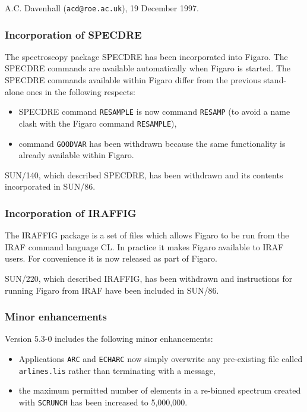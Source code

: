  A.C. Davenhall ({\tt acd@roe.ac.uk}), 19 December 1997.


\subsubsection{Incorporation of SPECDRE}

 The spectroscopy package SPECDRE has been incorporated into Figaro.  The
 SPECDRE commands are available automatically when Figaro is started.
 The SPECDRE commands available within Figaro differ from the previous
 stand-alone ones in the following respects:

\begin{itemize}

  \item SPECDRE command {\tt RESAMPLE} is now command {\tt RESAMP} (to
   avoid a name clash with the Figaro command {\tt RESAMPLE}),

  \item command {\tt GOODVAR} has been withdrawn because the same
   functionality is already available within Figaro.

\end{itemize}

 SUN/140, which described SPECDRE, has been withdrawn and its contents
 incorporated in SUN/86.

\subsubsection{Incorporation of IRAFFIG}

 The IRAFFIG package is a set of files which allows Figaro to be run
 from the IRAF command language CL.  In practice it makes Figaro
 available to IRAF users.  For convenience it is now released as part
 of Figaro.

 SUN/220, which described IRAFFIG, has been withdrawn and instructions for
 running Figaro from IRAF have been included in SUN/86.

\subsubsection{Minor enhancements}

 Version 5.3-0 includes the following minor enhancements:

\begin{itemize}

 \item Applications {\tt ARC} and {\tt ECHARC} now simply overwrite any
  pre-existing file called {\tt arlines.lis} rather than terminating with
  a message,

 \item the maximum permitted number of elements in a re-binned spectrum
  created with {\tt SCRUNCH} has been increased to 5,000,000.

\end{itemize}

